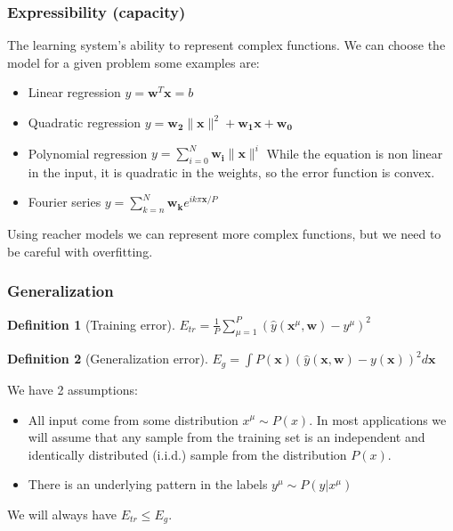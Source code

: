 \documentclass[11pt]{book} %
\newtheorem{definition}{Definition}[section]
\begin{document}
\subsubsection{Expressibility (capacity)}
The learning system's ability to represent complex functions.
We can choose the model for a given problem some examples are:
\begin{itemize}
    \item Linear regression $y = \mathbf{w}^T \mathbf{x} = b$
    \item Quadratic regression $y = \mathbf{w_2} \lVert \mathbf{x} \rVert^2 + \mathbf{w_1} \mathbf{x} + \mathbf{w_0}$
    \item Polynomial regression $y = \sum_{i=0}^{N} \mathbf{w_i} \lVert \mathbf{x} \rVert^i$
            While the equation is non linear in the input, it is quadratic in the weights, so the error function is convex.

    \item Fourier series $y = \sum_{k=n}^{N} \mathbf{w_k} e^{i k \pi \mathbf{x} / P}$ 
\end{itemize}
Using reacher models we can represent more complex functions, but we need to be careful with overfitting.

\subsubsection{Generalization}

\begin{definition}[Training error]
$E_{tr} = \frac{1}{P} \sum_{\mu=1}^{P} (\hat{y}(\mathbf{x}^\mu, \mathbf{w}) - y^\mu)^2$
\end{definition}

\begin{definition}[Generalization error]
$E_{g} = \int P(\mathbf{x}) (\hat{y}(\mathbf{x}, \mathbf{w}) - y(\mathbf{x}))^2 d\mathbf{x}$
\end{definition}

We have 2 assumptions:
\begin{itemize}
    \item All input come from some distribution $x^\mu \sim P(x)$. In most applications we will assume that any sample from the training set is an independent and identically distributed (i.i.d.) sample from the distribution $P(x)$.
    \item There is an underlying pattern in the labels $y^\mu \sim P(y|x^\mu)$
\end{itemize}
We will always have $E_{tr} \leq E_{g}$.
\end{document}

